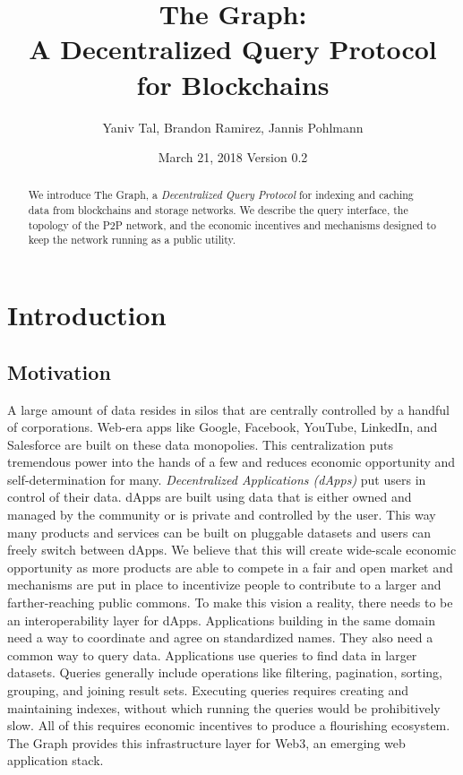 \documentclass[12pt]{article}
\title{The Graph: \protect\\ A Decentralized Query Protocol for Blockchains}
\author{Yaniv Tal, Brandon Ramirez, Jannis Pohlmann}
\date{March 21, 2018
\endgraf\bigskip Version 0.2}
\begin{document}
\maketitle
\begin{abstract}
\noindent
We introduce The Graph, a \textit{Decentralized Query Protocol} for indexing and caching data from blockchains and storage networks. We describe the query interface, the topology of the P2P network, and the economic incentives and mechanisms designed to keep the network running as a public utility.
\end{abstract}
\section{Introduction}
\subsection{Motivation}
A large amount of data resides in silos that are centrally controlled by a handful of corporations. Web-era apps like Google, Facebook, YouTube, LinkedIn, and Salesforce are built on these data monopolies. This centralization puts tremendous power into the hands of a few and reduces economic opportunity and self-determination for many.
\newline
\newline
\textit{Decentralized Applications (dApps)} put users in control of their data. dApps are built using data that is either owned and managed by the community or is private and controlled by the user. This way many products and services can be built on pluggable datasets and users can freely switch between dApps. We believe that this will create wide-scale economic opportunity as more products are able to compete in a fair and open market and mechanisms are put in place to incentivize people to contribute to a larger and farther-reaching public commons.
\newline
\newline
To make this vision a reality, there needs to be an interoperability layer for dApps. Applications building in the same domain need a way to coordinate and agree on standardized names. They also need a common way to query data. Applications use queries to find data in larger datasets. Queries generally include operations like filtering, pagination, sorting, grouping, and joining result sets. Executing queries requires creating and maintaining indexes, without which running the queries would be prohibitively slow. All of this requires economic incentives to produce a flourishing ecosystem. The Graph provides this infrastructure layer for Web3, an emerging web application stack.
\end{document}
